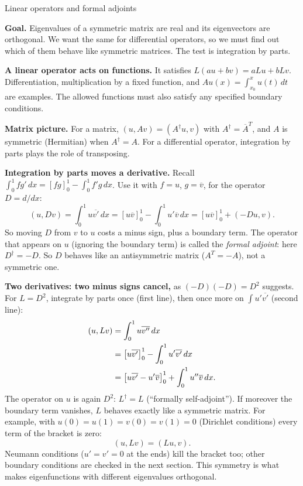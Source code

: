 \documentclass[11pt]{beamer}
\begin{document}
\begin{frame}[allowframebreaks=1.00]{Linear operators and formal adjoints}
\footnotesize

\textbf{Goal.} Eigenvalues of a symmetric matrix are real and its eigenvectors are orthogonal.
We want the same for differential operators, so we must find out which of them behave like
symmetric matrices. The test is integration by parts.

\textbf{A linear operator acts on functions.} It satisfies
$L(au+bv)=aLu+bLv$. Differentiation, multiplication by a fixed function, and
$Au(x)=\int_{x_0}^{x}u(t)\,dt$ are examples.
The allowed functions must also satisfy any specified boundary conditions.

\textbf{Matrix picture.} For a matrix, $(u,Av)=(A^\dagger u,v)$ with
$A^\dagger=\overline{A}^{T}$, and $A$ is symmetric (Hermitian) when $A^\dagger=A$.
For a differential operator, integration by parts plays the role of transposing.

\textbf{Integration by parts moves a derivative.} Recall \(\int_0^1fg'\,dx=[fg]_0^1-\int_0^1f'g\,dx\). Use it
with \(f=u\), \(g=\overline v\), for the operator \(D=d/dx\):
\begin{equation}
 (u,Dv)=\int_0^1u\overline{v'}\,dx
 =\left[u\overline v\right]_0^1-\int_0^1u'\overline v\,dx
 =\left[u\overline v\right]_0^1+(-Du,v).
 \label{eq:ddx-adjoint-general}
\end{equation}
So moving \(D\) from \(v\) to \(u\) costs a minus sign, plus a boundary term. The operator that appears on
\(u\) (ignoring the boundary term) is called the \emph{formal adjoint}: here \(D^\dagger=-D\). So \(D\) behaves
like an antisymmetric matrix (\(A^T=-A\)), not a symmetric one.

\textbf{Two derivatives: two minus signs cancel,} as \((-D)(-D)=D^2\) suggests. For \(L=D^2\), integrate by
parts once (first line), then once more on \(\int u'\overline{v'}\) (second line):
\begin{align}
 (u,Lv)&=\int_0^1u\overline{v''}\,dx\notag\\
 &=\left[u\overline{v'}\right]_0^1-\int_0^1u'\overline{v'}\,dx
 \label{eq:d2-ibp-once}\\
 &=\left[u\overline{v'}-u'\overline v\right]_0^1
   +\int_0^1u''\overline v\,dx.
 \label{eq:d2-ibp-twice}
\end{align}
The operator on \(u\) is again \(D^2\): \(L^\dagger=L\) (``formally self-adjoint''). If moreover the boundary term
vanishes, \(L\) behaves exactly like a symmetric matrix. For example, with \(u(0)=u(1)=v(0)=v(1)=0\)
(Dirichlet conditions) every term of the bracket is zero:
\begin{equation}
 (u,Lv)=(Lu,v).
 \label{eq:d2-adjoint}
\end{equation}
Neumann conditions ($u'=v'=0$ at the ends) kill the bracket too; other boundary
conditions are checked in the next section.  This
symmetry is what makes eigenfunctions with different eigenvalues orthogonal.
\end{frame}
\end{document}
